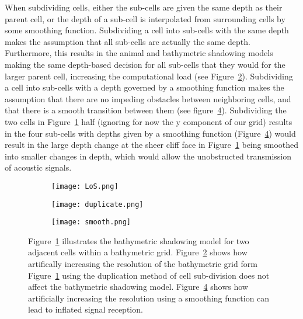  
When subdividing cells, either the sub-cells are given the same depth as their parent cell, or the depth of a sub-cell is interpolated from surrounding cells by some smoothing function.  Subdividing a cell into sub-cells with the same depth makes the assumption that all sub-cells are actually the same depth.  Furthermore, this results in the animal and bathymetric shadowing models making the same depth-based decision for all sub-cells that they would for the larger parent cell, increasing the computational load (see Figure~\ref{duplicate}).  Subdividing a cell into sub-cells with a depth governed by a smoothing function makes the assumption that there are no impeding obstacles between neighboring cells, and that there is a smooth transition between them (see figure~\ref{smooth}).  Subdividing the two cells in Figure~\ref{LoS} half (ignoring for now the y component of our grid) results in the four sub-cells with depths given by a smoothing function (Figure~\ref{smooth}) would result in the large depth change at the sheer cliff face in Figure~\ref{LoS} being smoothed into smaller changes in depth, which would allow the unobstructed transmission of acoustic signals.
\begin{figure}[h!]
	\label{resolutionScale}
	\begin{subfigure}[t]{.4\textwidth}
		\centering
		\texttt{[image: LoS.png]}
		\caption{}\label{LoS}
	\end{subfigure}
	
	\begin{subfigure}[t]{.4\textwidth}
		\centering
		\texttt{[image: duplicate.png]}
		\caption{}\label{duplicate}
	\end{subfigure}
	
	\begin{subfigure}[t]{.4\textwidth}
		\centering
		\texttt{[image: smooth.png]}
		\caption{}\label{smooth}
	\end{subfigure}
	
	\caption{Figure~\ref{LoS} illustrates the bathymetric shadowing model for two adjacent cells within a bathymetric grid.  Figure~\ref{duplicate} shows how artifically increasing the resolution of the bathymetric grid form Figure~\ref{LoS} using the duplication method of cell sub-division does not affect the bathymetric shadowing model.  Figure~\ref{smooth} shows how artificially increasing the resolution using a smoothing function can lead to inflated signal reception.}
\end{figure}

